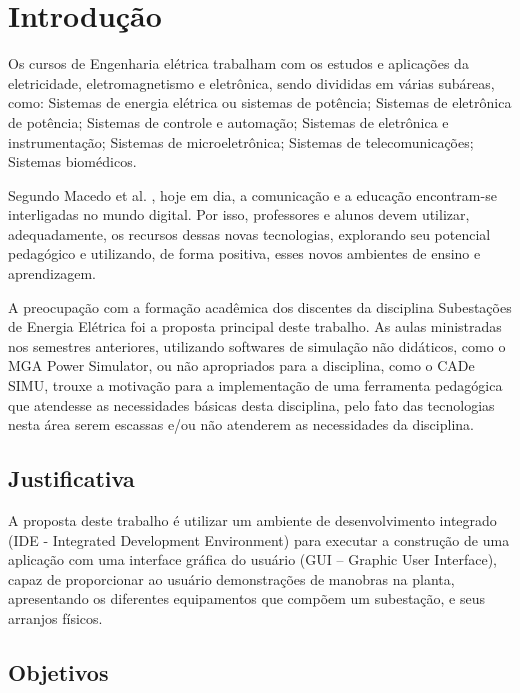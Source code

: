 \chapter{Introdução}
\label{chap:Introducao}

Os cursos de Engenharia elétrica trabalham com os estudos e aplicações da eletricidade, eletromagnetismo e eletrônica, sendo divididas em várias subáreas, como: Sistemas de energia elétrica ou sistemas de potência; Sistemas de eletrônica de potência; Sistemas de controle e automação; Sistemas de eletrônica e instrumentação; Sistemas de microeletrônica; Sistemas de telecomunicações; Sistemas biomédicos.

Segundo Macedo et al. \citeyearpar{macedo2012novas}, hoje em dia, a comunicação e a educação encontram-se interligadas no mundo digital.
Por isso, professores e alunos devem utilizar, adequadamente, os recursos dessas novas
tecnologias, explorando seu potencial pedagógico e utilizando, de forma positiva, esses novos
ambientes de ensino e aprendizagem.

A preocupação com a formação acadêmica dos discentes da disciplina Subestações de Energia Elétrica foi a proposta principal deste trabalho. As aulas ministradas nos semestres anteriores, utilizando softwares de simulação não didáticos, como o MGA Power Simulator, ou não apropriados para a disciplina, como o CADe SIMU, trouxe a motivação para a implementação de uma ferramenta pedagógica que atendesse as necessidades básicas desta disciplina, pelo fato das tecnologias nesta área serem escassas e/ou não atenderem as necessidades da disciplina.


\section{Justificativa}

A proposta deste trabalho é utilizar um ambiente de desenvolvimento integrado (IDE -  Integrated Development Environment) para executar a construção de uma aplicação com uma interface gráfica do usuário (GUI – Graphic User Interface), capaz de proporcionar ao usuário demonstrações de manobras na planta, apresentando os diferentes equipamentos que compõem um subestação, e seus arranjos físicos.


\section{Objetivos}

